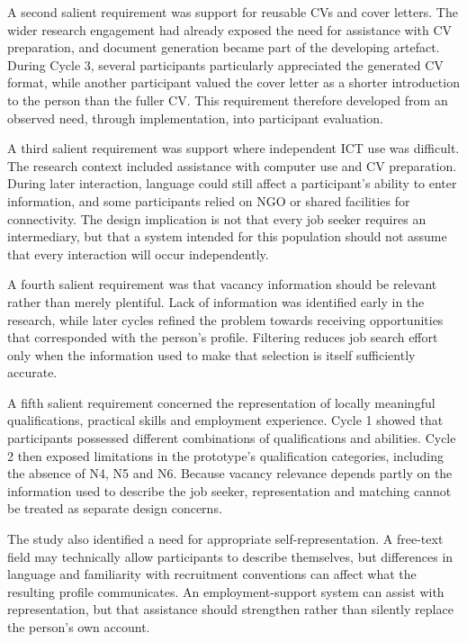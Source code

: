 A second salient requirement was support for reusable CVs and cover letters. The wider research engagement had already exposed the need for assistance with CV preparation, and document generation became part of the developing artefact. During Cycle 3, several participants particularly appreciated the generated CV format, while another participant valued the cover letter as a shorter introduction to the person than the fuller CV. This requirement therefore developed from an observed need, through implementation, into participant evaluation.

A third salient requirement was support where independent ICT use was difficult. The research context included assistance with computer use and CV preparation. During later interaction, language could still affect a participant's ability to enter information, and some participants relied on NGO or shared facilities for connectivity. The design implication is not that every job seeker requires an intermediary, but that a system intended for this population should not assume that every interaction will occur independently.

A fourth salient requirement was that vacancy information should be relevant rather than merely plentiful. Lack of information was identified early in the research, while later cycles refined the problem towards receiving opportunities that corresponded with the person's profile. Filtering reduces job search effort only when the information used to make that selection is itself sufficiently accurate.

A fifth salient requirement concerned the representation of locally meaningful qualifications, practical skills and employment experience. Cycle 1 showed that participants possessed different combinations of qualifications and abilities. Cycle 2 then exposed limitations in the prototype's qualification categories, including the absence of N4, N5 and N6. Because vacancy relevance depends partly on the information used to describe the job seeker, representation and matching cannot be treated as separate design concerns.

The study also identified a need for appropriate self-representation. A free-text field may technically allow participants to describe themselves, but differences in language and familiarity with recruitment conventions can affect what the resulting profile communicates. An employment-support system can assist with representation, but that assistance should strengthen rather than silently replace the person's own account.

